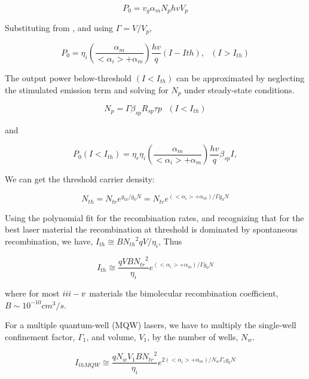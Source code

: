 \begin{equation}
  P_0 = v_g\alpha_{m}N_phvV_p
\end{equation}

Substituting from , and using $\Gamma = V/V_p$,

\begin{equation}
  P_0 = \eta_i(\frac{\alpha_m}{<\alpha_i> + \alpha_m})\frac{hv}{q}(I - I{th}),~~~(I > I_{th})
\end{equation}

The output power below-threshold $(I < I_{th})$ can be approximated by
neglecting the stimulated emission term and solving for $N_p$ under
steady-state conditions.

\begin{equation}
N_p = \Gamma\beta_{sp}R_{sp}\tau{p}~~~(I < I_{th})
\end{equation}

and

\begin{equation}
  P_0(I < I_{th}) = \eta_r\eta_i\left(\frac{\alpha_m}{<\alpha_i> + \alpha_m}\right)\frac{hv}{q}\beta_{sp}I,
\end{equation}

We can get the threshold carrier density:

\begin{equation}
  N_{th} = N_{tr}e^{g_{th}/g_{0}N} = N_{tr}e^{(<\alpha_i> + \alpha_m)/\Gamma{g_{0}}N}
\end{equation}

Using the polynomial fit for the recombination rates, and recognizing that for
the best laser material the recombination at threshold is dominated by
spontaneous recombination, we have, $I_{th}\cong B{N_{th}}^2qV/\eta_i$, Thus

\begin{equation}
  I_{th} {\cong} \frac{qVB{N_{tr}}^2}{\eta_i}e^{(<\alpha_i> + \alpha_m)/\Gamma{g_0}N}
\end{equation}

where for most $\uppercase\expandafter{\romannumeral3} -
\uppercase\expandafter{\romannumeral5}$ materials the bimolecular recombination
coefficient, $B \sim 10^{-10} cm^3/s$.

For a multiple quantum-well (MQW) lasers, we have to multiply the single-well
confinement factor, $\Gamma_1$, and volume, $V_1$, by the number of wells,
$N_w$.

\begin{equation}
  I_{thMQW} {\cong} \frac{qN_{w}V_{1}B{N_{tr}}^2}{\eta_i}e^{2(<\alpha_i> + \alpha_m)/{N_w\Gamma_{1}g_{0}N}}
\end{equation}


